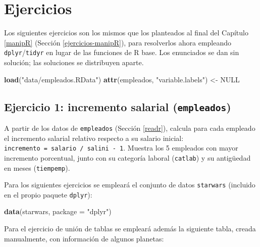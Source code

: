\documentclass[
]{book}
\newenvironment{Shaded}{\begin{snugshade}}{\end{snugshade}}
\newcommand{\AttributeTok}[1]{\textcolor[rgb]{0.13,0.29,0.53}{#1}}
\newcommand{\ConstantTok}[1]{\textcolor[rgb]{0.56,0.35,0.01}{#1}}
\newcommand{\FunctionTok}[1]{\textcolor[rgb]{0.13,0.29,0.53}{\textbf{#1}}}
\newcommand{\NormalTok}[1]{#1}
\newcommand{\OtherTok}[1]{\textcolor[rgb]{0.56,0.35,0.01}{#1}}
\newcommand{\StringTok}[1]{\textcolor[rgb]{0.31,0.60,0.02}{#1}}
\theoremstyle{break}
\theoremstyle{nonumberplain}
\begin{document}
\section{Ejercicios}\label{ejercicios-tidyverse}

Los siguientes ejercicios son los mismos que los planteados al final del
Capítulo \ref{manipR} (Sección \ref{ejercicios-manipR}), para resolverlos
ahora empleando \texttt{dplyr}/\texttt{tidyr} en lugar de las funciones de R base. Los
enunciados se dan sin solución; las soluciones se distribuyen aparte.

\begin{Shaded}
\begin{Highlighting}[]
\FunctionTok{load}\NormalTok{(}\StringTok{"data/empleados.RData"}\NormalTok{)}
\FunctionTok{attr}\NormalTok{(empleados, }\StringTok{"variable.labels"}\NormalTok{) }\OtherTok{\textless{}{-}} \ConstantTok{NULL}
\end{Highlighting}
\end{Shaded}

\subsection{\texorpdfstring{Ejercicio 1: incremento salarial (\texttt{empleados})}{Ejercicio 1: incremento salarial (empleados)}}\label{ejercicio-1-incremento-salarial-empleados-1}

A partir de los datos de \texttt{empleados} (Sección \ref{readr}), calcula para
cada empleado el incremento salarial relativo respecto a su salario inicial:
\texttt{incremento\ =\ salario\ /\ salini\ -\ 1}. Muestra los 5 empleados con mayor
incremento porcentual, junto con su categoría laboral (\texttt{catlab}) y su
antigüedad en meses (\texttt{tiempemp}).

Para los siguientes ejercicios se empleará el conjunto de datos \texttt{starwars}
(incluido en el propio paquete \texttt{dplyr}):

\begin{Shaded}
\begin{Highlighting}[]
\FunctionTok{data}\NormalTok{(starwars, }\AttributeTok{package =} \StringTok{"dplyr"}\NormalTok{)}
\end{Highlighting}
\end{Shaded}

Para el ejercicio de unión de tablas se empleará además la siguiente tabla,
creada manualmente, con información de algunos planetas:
\end{document}
